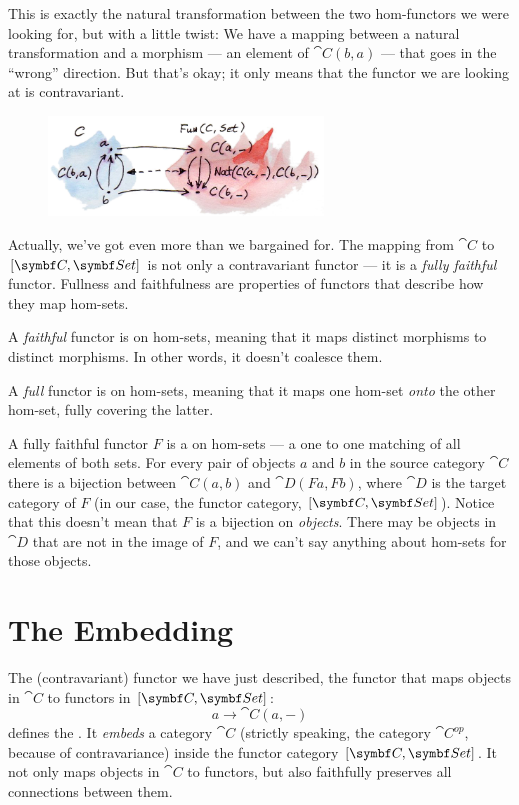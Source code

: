 \noindent
This is exactly the natural transformation between the two hom-functors
we were looking for, but with a little twist: We have a mapping between
a natural transformation and a morphism --- an element of
$\cat{C}(b, a)$ --- that goes in the ``wrong'' direction. But that's
okay; it only means that the functor we are looking at is contravariant.

\begin{figure}[H]
  \centering
  \includegraphics[width=0.65\textwidth]{images/yoneda-embedding-2.jpg}
\end{figure}

\noindent
Actually, we've got even more than we bargained for. The mapping from
$\cat{C}$ to $[\cat{C}, \Set]$ is not only a contravariant functor
--- it is a \emph{fully faithful} functor. Fullness and faithfulness are
properties of functors that describe how they map hom-sets.

A \emph{faithful} functor is  on hom-sets, meaning that
it maps distinct morphisms to distinct morphisms. In other words, it
doesn't coalesce them.

A \emph{full} functor is  on hom-sets, meaning that it
maps one hom-set \emph{onto} the other hom-set, fully covering the
latter.

A fully faithful functor $F$ is a  on hom-sets
--- a one to one matching of all elements of both sets. For every pair
of objects $a$ and $b$ in the source category $\cat{C}$
there is a bijection between $\cat{C}(a, b)$ and
$\cat{D}(F a, F b)$, where $\cat{D}$ is the target category of
$F$ (in our case, the functor category, $[\cat{C}, \Set]$).
Notice that this doesn't mean that $F$ is a bijection on
\emph{objects}. There may be objects in $\cat{D}$ that are not in the
image of $F$, and we can't say anything about hom-sets for those
objects.

\section{The Embedding}

The (contravariant) functor we have just described, the functor that
maps objects in $\cat{C}$ to functors in $[\cat{C}, \Set]$:
\[a \to \cat{C}(a, -)\]
defines the . It \emph{embeds} a category
$\cat{C}$ (strictly speaking, the category $\cat{C}^\mathit{op}$,
because of contravariance) inside the functor category
$[\cat{C}, \Set]$. It not only maps objects in $\cat{C}$ to
functors, but also faithfully preserves all connections between them.

